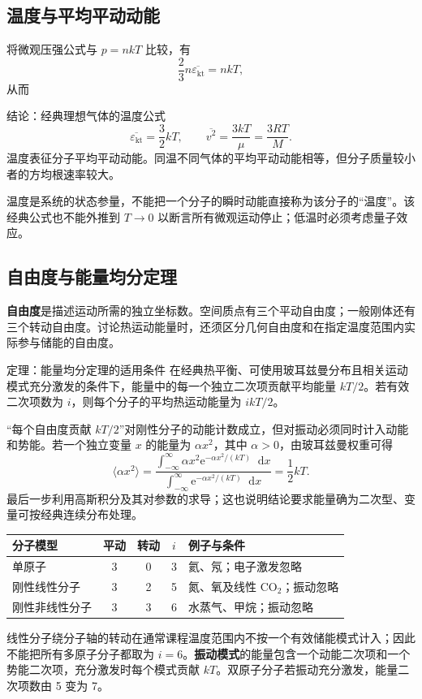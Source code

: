 \documentclass[UTF8,fontset=none,zihao=-4,a4paper]{ctexart}
\newcommand{\term}[1]{\textbf{#1}}
\newcommand{\dd}{\mathop{}\!\mathrm{d}}
\newcommand{\ee}{\mathrm{e}}
\begin{document}
\subsection{温度与平均平动动能}
将微观压强公式与 $p=nkT$ 比较，有
\[
 \frac23n\overline{\varepsilon_{\mathrm{kt}}}=nkT,
\]
从而
\begin{infobox}{结论：经典理想气体的温度公式}
\[
 \overline{\varepsilon_{\mathrm{kt}}}=\frac32kT,
 \qquad \overline{v^2}=\frac{3kT}{\mu}=\frac{3RT}{M}.
\]
温度表征分子平均平动动能。同温不同气体的平均平动动能相等，但分子质量较小者的方均根速率较大。
\end{infobox}
温度是系统的状态参量，不能把一个分子的瞬时动能直接称为该分子的“温度”。该经典公式也不能外推到 $T\to0$ 以断言所有微观运动停止；低温时必须考虑量子效应。

\subsection{自由度与能量均分定理}
\term{自由度}是描述运动所需的独立坐标数。空间质点有三个平动自由度；一般刚体还有三个转动自由度。讨论热运动能量时，还须区分几何自由度和在指定温度范围内实际参与储能的自由度。

\begin{infobox}{定理：能量均分定理的适用条件}
在经典热平衡、可使用玻耳兹曼分布且相关运动模式充分激发的条件下，能量中的每一个独立二次项贡献平均能量 $kT/2$。若有效二次项数为 $i$，则每个分子的平均热运动能量为 $ikT/2$。
\end{infobox}
“每个自由度贡献 $kT/2$”对刚性分子的动能计数成立，但对振动必须同时计入动能和势能。若一个独立变量 $x$ 的能量为 $\alpha x^2$，其中 $\alpha>0$，由玻耳兹曼权重可得
\[
 \langle\alpha x^2\rangle
 =\frac{\displaystyle\int_{-\infty}^{\infty}\alpha x^2
 \ee^{-\alpha x^2/(kT)}\dd x}
 {\displaystyle\int_{-\infty}^{\infty}\ee^{-\alpha x^2/(kT)}\dd x}
 =\frac12kT.
\]
最后一步利用高斯积分及其对参数的求导；这也说明结论要求能量确为二次型、变量可按经典连续分布处理。

\begin{center}
\begin{tabularx}{\linewidth}{Y c c c Y}
\toprule
分子模型 & 平动 & 转动 & $i$ & 例子与条件\\
\midrule
单原子 & 3 & 0 & 3 & 氦、氖；电子激发忽略\\
刚性线性分子 & 3 & 2 & 5 & 氮、氧及线性 $\mathrm{CO_2}$；振动忽略\\
刚性非线性分子 & 3 & 3 & 6 & 水蒸气、甲烷；振动忽略\\
\bottomrule
\end{tabularx}
\end{center}
线性分子绕分子轴的转动在通常课程温度范围内不按一个有效储能模式计入；因此不能把所有多原子分子都取为 $i=6$。\term{振动模式}的能量包含一个动能二次项和一个势能二次项，充分激发时每个模式贡献 $kT$。双原子分子若振动充分激发，能量二次项数由 5 变为 7。
\end{document}

